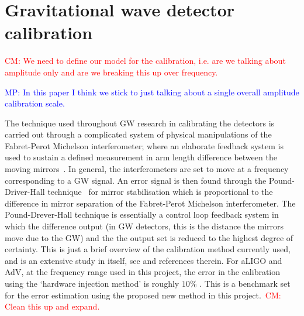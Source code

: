 \documentclass[10pt]{iopart}
\newcommand{\cm}[1]{\textcolor{red}{CM: #1}}
\newcommand{\MP}[1]{\textcolor{blue}{MP: #1}}
\begin{document}
\section{Gravitational wave detector calibration\label{sec:calibration}}

\cm{We need to define our model for the calibration, i.e. are we talking
about amplitude only and are we breaking this up over frequency.}

\MP{In this paper I think we stick to just talking about a single overall amplitude calibration scale.}

The technique used throughout GW research in calibrating the detectors is
carried out through a complicated system of physical manipulations of the
Fabret-Perot Michelson interferometer; where an elaborate feedback system is
used to sustain a defined measurement in arm length difference between the
moving mirrors~\cite{LIGOCal}. In general, the interferometers are set to move
at a frequency corresponding to a GW signal. An error signal is then found
through the Pound-Driver-Hall technique~\cite{Black} for mirror stabilisation
which is proportional to the difference in mirror separation of the
Fabret-Perot Michelson interferometer. The Pound-Drever-Hall technique is
essentially a control loop feedback system in which the difference output (in
GW detectors, this is the distance the mirrors move due to the GW) and the the
output set is reduced to the highest degree of certainty. This is just a brief
overview of the calibration method currently used, and is an extensive study in
itself, see \cite{Vitale:2012} and references therein. For \ac{aLIGO} and \ac{AdV},
at the frequency range used in this project, the error in the calibration using
the `hardware injection method' is roughly $10\%$ \cite{Vitale:2012}. This is a
benchmark set for the error estimation using the proposed new method in this
project.~\cm{Clean this up and expand.}
\end{document}
